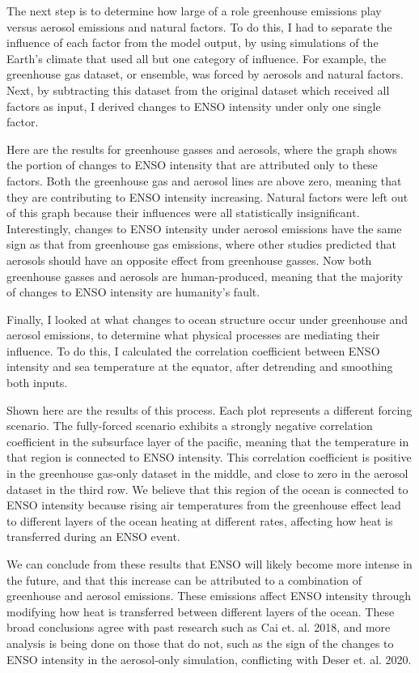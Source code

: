\documentclass{basic}
\begin{document}
The next step is to determine how large of a role greenhouse emissions play versus aerosol emissions and natural factors. To do this, I had to separate the influence of each factor from the model output, by using simulations of the Earth's climate that used all but one category of influence. For example, the greenhouse gas dataset, or ensemble, was forced by aerosols and natural factors. Next, by subtracting this dataset from the original dataset which received all factors as input, I derived changes to ENSO intensity under only one single factor.

Here are the results for greenhouse gasses and aerosols, where the graph shows the portion of changes to ENSO intensity that are attributed only to these factors. Both the greenhouse gas and aerosol lines are above zero, meaning that they are contributing to ENSO intensity increasing. Natural factors were left out of this graph because their influences were all statistically insignificant. Interestingly, changes to ENSO intensity under aerosol emissions have the same sign as that from greenhouse gas emissions, where other studies predicted that aerosols should have an opposite effect from greenhouse gasses. Now both greenhouse gasses and aerosols are human-produced, meaning that the majority of changes to ENSO intensity are humanity's fault.

Finally, I looked at what changes to ocean structure occur under greenhouse and aerosol emissions, to determine what physical processes are mediating their influence. To do this, I calculated the correlation coefficient between ENSO intensity and sea temperature at the equator, after detrending and smoothing both inputs.

Shown here are the results of this process. Each plot represents a different forcing scenario. The fully-forced scenario exhibits a strongly negative correlation coefficient in the subsurface layer of the pacific, meaning that the temperature in that region is connected to ENSO intensity. This correlation coefficient is positive in the greenhouse gas-only dataset in the middle, and close to zero in the aerosol dataset in the third row. We believe that this region of the ocean is connected to ENSO intensity because rising air temperatures from the greenhouse effect lead to different layers of the ocean heating at different rates, affecting how heat is transferred during an ENSO event.

We can conclude from these results that ENSO will likely become more intense in the future, and that this increase can be attributed to a combination of greenhouse and aerosol emissions. These emissions affect ENSO intensity through modifying how heat is transferred between different layers of the ocean. These broad conclusions agree with past research such as Cai et. al. 2018, and more analysis is being done on those that do not, such as the sign of the changes to ENSO intensity in the aerosol-only simulation, conflicting with Deser et. al. 2020.
\end{document}
